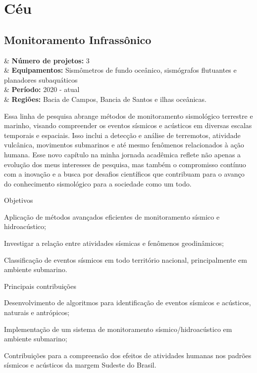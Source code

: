 \documentclass[10pt,a4paper,oneside]{book}
\begin{document}
\chapter{Céu}
\label{cap_ceu}

\section{Monitoramento Infrassônico}
\begin{summarybox}[frametitle=\faProjectDiagram{}\quad Panorama da linha de pesquisa]
	\begin{datelist}
		\faFile* & \textbf{Número de projetos:} 3 \\
		\faBinoculars & \textbf{Equipamentos:} Sismômetros de fundo oceânico, sismógrafos flutuantes e planadores subaquáticos \\
		\faCalendar*[regular] & \textbf{Período:} 2020 - atual \\
		\faMapMarked* & \textbf{Regiões:} Bacia de Campos, Bancia de Santos e ilhas oceânicas. \\
	\end{datelist}
\end{summarybox}

\bigskip

Essa linha de pesquisa abrange métodos de monitoramento sismológico terrestre e marinho, visando compreender os eventos sísmicos e acústicos em diversas escalas temporais e espaciais. Isso inclui a detecção e análise de terremotos, atividade vulcânica, movimentos submarinos e até mesmo fenômenos relacionados à ação humana. Esse novo capítulo na minha jornada acadêmica reflete não apenas a evolução dos meus interesses de pesquisa, mas também o compromisso contínuo com a inovação e a busca por desafios científicos que contribuam para o avanço do conhecimento sismológico para a sociedade como um todo.

\begin{fancyenum}{\faFutbol}{Objetivos}
  \item Aplicação de métodos avançados eficientes de monitoramento sísmico e hidroacústico;
  \item Investigar a relação entre atividades sísmicas e fenômenos geodinâmicos;
  \item Classificação de eventos sísmicos em todo território nacional, principalmente em ambiente submarino.
\end{fancyenum}

\begin{fancyenum}{\faCogs}{Principais contribuições}
  \item Desenvolvimento de algoritmos para identificação de eventos sísmicos e acústicos, naturais e antrópicos;
  \item Implementação de um sistema de monitoramento sísmico/hidroacústico em ambiente submarino;
  \item Contribuições para a compreensão dos efeitos de atividades humanas nos padrões sísmicos e acústicos da margem Sudeste do Brasil.
\end{fancyenum}
\end{document}
